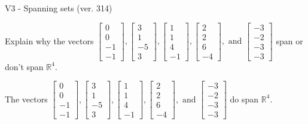 \begin{exercise}
  \begin{exerciseTitle}V3 - Spanning sets (ver. 314)\end{exerciseTitle}
  \begin{exerciseStatement}
    Explain why the vectors \(\left[\begin{array}{r}
0 \\
0 \\
-1 \\
-1
\end{array}\right] , \left[\begin{array}{r}
3 \\
1 \\
-5 \\
3
\end{array}\right] , \left[\begin{array}{r}
1 \\
1 \\
4 \\
-1
\end{array}\right] , \left[\begin{array}{r}
2 \\
2 \\
6 \\
-4
\end{array}\right] , \text{ and } \left[\begin{array}{r}
-3 \\
-2 \\
-3 \\
-3
\end{array}\right]\) span or don't span \(\mathbb{R}^4\). 
	


  \end{exerciseStatement}
  \begin{exerciseAnswer}
   The vectors \(\left[\begin{array}{r}
0 \\
0 \\
-1 \\
-1
\end{array}\right] , \left[\begin{array}{r}
3 \\
1 \\
-5 \\
3
\end{array}\right] , \left[\begin{array}{r}
1 \\
1 \\
4 \\
-1
\end{array}\right] , \left[\begin{array}{r}
2 \\
2 \\
6 \\
-4
\end{array}\right] , \text{ and } \left[\begin{array}{r}
-3 \\
-2 \\
-3 \\
-3
\end{array}\right]\) 
  	 do  
	span \(\mathbb{R}^4\).
  



\end{exerciseAnswer}
\end{exercise}
